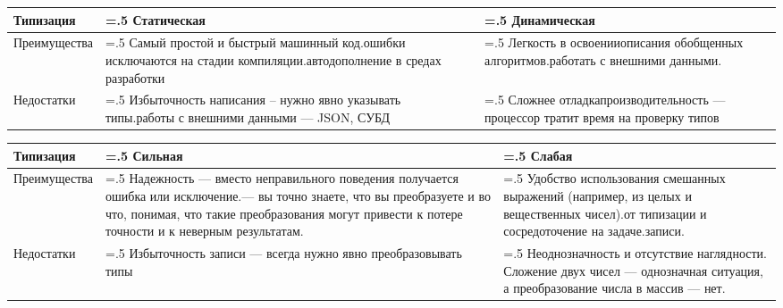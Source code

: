 \documentclass[book.tex]{subfiles}
\begin{document}
\begin{tabularx}{0.95\textwidth}{ | l | >{\hsize=.5\hsize}X | >{\hsize=.5\hsize}X | }
    \hline
    Типизация & Статическая & Динамическая \\\hline
    Преимущества & Самый простой и быстрый машинный код. ошибки исключаются на стадии компиляции. автодополнение в средах разработки & Легкость в освоении описания обобщенных алгоритмов. работать с внешними данными.\\\hline
    Недостатки & Избыточность написания -- нужно явно указывать типы. работы с внешними данными --- JSON, СУБД & Сложнее отладка производительность --- процессор тратит время на проверку типов\\\hline
\end{tabularx}


\begin{tabularx}{0.95\textwidth}{ | l | >{\hsize=.5\hsize}X | >{\hsize=.5\hsize}X | }
    \hline
    Типизация & Сильная & Слабая \\\hline
    Преимущества & Надежность --- вместо неправильного поведения получается ошибка или исключение. --- вы точно знаете, что вы преобразуете и во что, понимая, что такие преобразования могут привести к потере точности и к неверным результатам. & Удобство использования смешанных выражений (например, из целых и вещественных чисел). от типизации и сосредоточение на задаче. записи. \\\hline
    Недостатки & Избыточность записи --- всегда нужно явно преобразовывать типы & Неоднозначность и отсутствие наглядности. Сложение двух чисел --- однозначная ситуация, а преобразование числа в массив --- нет.\\\hline
\end{tabularx}
\end{document}
